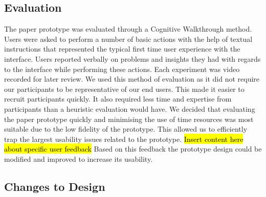 \documentclass{article}
\begin{document}
\subsection{Evaluation}
The paper prototype was evaluated through a Cognitive Walkthrough method\cite{Bowman2002}. Users were asked to perform a number of basic actions with the help of textual instructions that represented the typical first time user experience with the interface. Users reported verbally on problems and insights they had with regards to the interface while performing these actions. Each experiment was video recorded for later review.
\newline\newline
We used this method of evaluation as it did not require our participants to be representative of our end users\cite{Bowman2002}. This made it easier to recruit participants quickly. It also required less time and expertise from participants than a heuristic evaluation would have. We decided that evaluating the paper prototype quickly and minimising the use of time resources was most suitable due to the low fidelity of the prototype. This allowed us to efficiently trap the largest usability issues related to the prototype.
\newline\newline
\hl{Insert content here about specific user feedback}
\newline\newline
Based on this feedback the prototype design could be modified and improved to increase its usability.


\subsection{Changes to Design}
\end{document}
